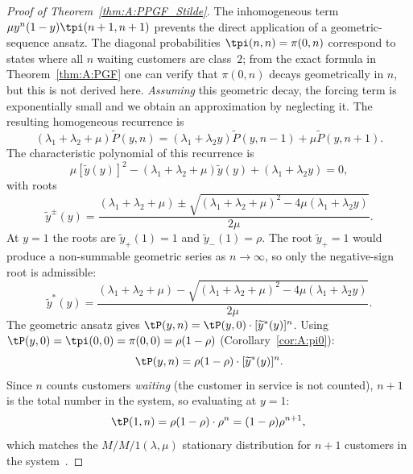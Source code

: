 \begin{proof}[Proof of Theorem~\ref{thm:A:PPGF_Stilde}]
The inhomogeneous term $\mu y^n(1-y)\tpi(n+1,n+1)$ prevents the direct application
of a geometric-sequence ansatz. The diagonal probabilities $\tpi(n,n)=\pi(0,n)$
correspond to states where all $n$ waiting customers are class~$2$; from the exact
formula in Theorem~\ref{thm:A:PGF} one can verify that $\pi(0,n)$ decays
geometrically in $n$, but this is not derived here. \emph{Assuming} this geometric
decay, the forcing term is exponentially small and we obtain an approximation by
neglecting it. The resulting homogeneous recurrence is
\begin{equation}
    (\lambda_1 + \lambda_2 + \mu) \widetilde{P}(y,n) = (\lambda_1 + \lambda_2 y) \widetilde{P}(y,n-1) + \mu \widetilde{P}(y,n+1).
\end{equation}
The characteristic polynomial of this recurrence is
\begin{equation}
    \mu [\widetilde{y}(y)]^2 - (\lambda_1 + \lambda_2 + \mu) \widetilde{y}(y) + (\lambda_1 + \lambda_2 y) = 0,
\end{equation}
with roots
\begin{equation}
    \widetilde{y}^{\pm}(y) = \frac{(\lambda_1 + \lambda_2 + \mu) \pm \sqrt{(\lambda_1 + \lambda_2 + \mu)^2 - 4\mu(\lambda_1 + \lambda_2 y)}}{2\mu}.
\end{equation}
At $y=1$ the roots are $\widetilde{y}_{+}(1)=1$ and $\widetilde{y}_{-}(1)=\rho$.
The root $\widetilde{y}_{+}=1$ would produce a non-summable geometric series as
$n\to\infty$, so only the negative-sign root is admissible:
\begin{equation}
    \widetilde{y}^*(y) = \frac{(\lambda_1 + \lambda_2 + \mu) - \sqrt{(\lambda_1 + \lambda_2 + \mu)^2 - 4\mu(\lambda_1 + \lambda_2 y)}}{2\mu}.
\end{equation}
The geometric ansatz gives $\tP(y,n)=\tP(y,0) \cdot [\widetilde{y}^*(y)]^n$.
Using $\tP(y,0)=\tpi(0,0)=\pi(0,0)=\rho(1-\rho)$ (Corollary~\ref{cor:A:pi0}):
\begin{equation}
    \tP(y,n)=\rho(1-\rho) \cdot  [\widetilde{y}^*(y)]^n.
\end{equation}
Since $n$ counts customers \emph{waiting} (the customer in service is not counted),
$n+1$ is the total number in the system, so evaluating at $y=1$:
\begin{equation}
    \tP(1,n)= \rho(1-\rho) \cdot\rho^n= (1-\rho) \rho^{n+1}, \qedhere
\end{equation}
which matches the $M/M/1(\lambda,\mu)$ stationary distribution for $n+1$ customers
in the system~\cite{adan2002queueing}.
\end{proof}

